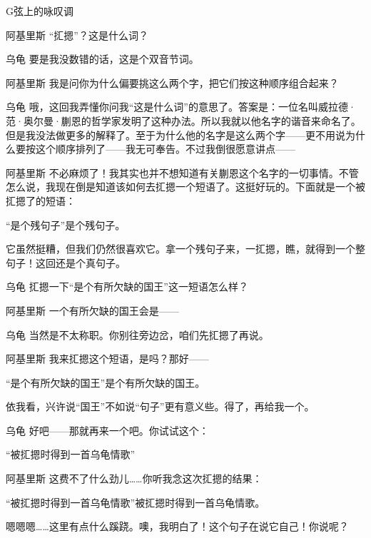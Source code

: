 \begin{dialog}{G弦上的咏叹调}
\begin{dialogue}
\item[阿基里斯]“㧟摁”？这是什么词？

\item[乌龟]要是我没数错的话，这是个双音节词。

\item[阿基里斯]我是问你为什么偏要挑这么两个字，把它们按这种顺序组合起来？

\item[乌龟]哦，这回我弄懂你问我“这是什么词”的意思了。答案是：一位名叫威拉德·范·奥尔曼·蒯恩的哲学家发明了这种办法。所以我就以他名字的谐音来命名了。但是我没法做更多的解释了。至于为什么他的名字是这么两个字——更不用说为什么要按这个顺序排列了——我无可奉告。不过我倒很愿意讲点——

\item[阿基里斯]不必麻烦了！我其实也并不想知道有关蒯恩这个名字的一切事情。不管怎么说，我现在倒是知道该如何去㧟摁一个短语了。这挺好玩的。下面就是一个被㧟摁了的短语：
\begin{block}
“是个残句子”是个残句子。
\end{block}
它虽然挺糟，但我们仍然很喜欢它。拿一个残句子来，一㧟摁，瞧，就得到一个整句子！这回还是个真句子。

\item[乌龟]㧟摁一下“是个有所欠缺的国王”这一短语怎么样？

\item[阿基里斯]一个有所欠缺的国王会是——

\item[乌龟]当然是不太称职。你别往旁边岔，咱们先㧟摁了再说。

\item[阿基里斯]我来㧟摁这个短语，是吗？那好——
\begin{block}
“是个有所欠缺的国王”是个有所欠缺的国王。
\end{block}

依我看，兴许说“国王”不如说“句子”更有意义些。得了，再给我一个。

\item[乌龟]好吧——那就再来一个吧。你试试这个：
\begin{block}
“被㧟摁时得到一首乌龟情歌”
\end{block}

\item[阿基里斯]这费不了什么劲儿……你听我念这次㧟摁的结果：
\begin{block}
“被㧟摁时得到一首乌龟情歌”被㧟摁时得到一首乌龟情歌。
\end{block}

嗯嗯嗯……这里有点什么蹊跷。噢，我明白了！这个句子在说它自己！你说呢？


\end{dialogue}
\end{dialog}
